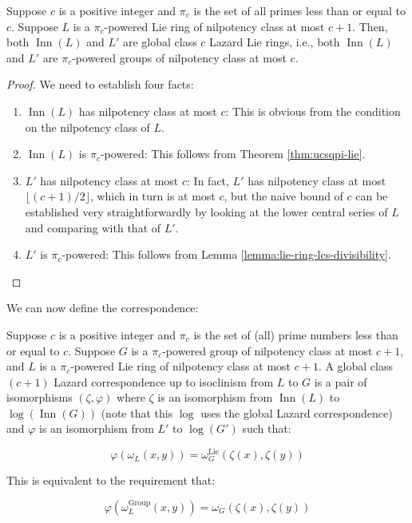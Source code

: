 \documentclass{ucetd}
\begin{document}
\begin{lemma}
  Suppose $c$ is a positive integer and $\pi_c$ is the set of all primes
  less than or equal to $c$. Suppose $L$ is a $\pi_c$-powered Lie ring of
  nilpotency class at most $c + 1$. Then, both $\operatorname{Inn}(L)$
  and $L'$ are global class $c$ Lazard Lie rings, i.e., both
  $\operatorname{Inn}(L)$ and $L'$ are $\pi_c$-powered groups of
  nilpotency class at most $c$.
\end{lemma}

\begin{proof}
  We need to establish four facts:

  \begin{enumerate}
  \item $\operatorname{Inn}(L)$ has nilpotency class at most $c$: This
    is obvious from the condition on the nilpotency class of $L$.
  \item $\operatorname{Inn}(L)$ is $\pi_c$-powered: This follows from
    Theorem \ref{thm:ucsqpi-lie}.
  \item $L'$ has nilpotency class at most $c$: In fact, $L'$ has
    nilpotency class at most $\lfloor (c + 1)/2 \rfloor$, which in
    turn is at most $c$, but the naive bound of $c$ can be established
    very straightforwardly by looking at the lower central series of
    $L$ and comparing with that of $L'$. %
  \item $L'$ is $\pi_c$-powered: This follows from Lemma
    \ref{lemma:lie-ring-lcs-divisibility}.
  \end{enumerate}
\end{proof}

We can now define the correspondence:

\begin{definer}
  Suppose $c$ is a positive integer and $\pi_c$ is the set of (all)
  prime numbers less than or equal to $c$. Suppose $G$ is a
  $\pi_c$-powered group of nilpotency class at most $c + 1$, and $L$ is
  a $\pi_c$-powered Lie ring of nilpotency class at most $c + 1$. A
  global class $(c + 1)$ Lazard correspondence up to isoclinism from $L$ to
  $G$ is a pair of isomorphisms $(\zeta,\varphi)$ where $\zeta$ is an
  isomorphism from $\operatorname{Inn}(L)$ to
  $\log(\operatorname{Inn}(G))$ (note that this $\log$ uses the global
  Lazard correspondence) and $\varphi$ is an isomorphism from $L'$ to
  $\log(G')$ such that:

  $$\varphi(\omega_L(x,y)) = \omega^{\text{Lie}}_G(\zeta(x),\zeta(y))$$

  This is equivalent to the requirement that:

  $$\varphi(\omega^{\text{Group}}_L(x,y)) = \omega_G(\zeta(x),\zeta(y))$$
\end{definer}
\end{document}
